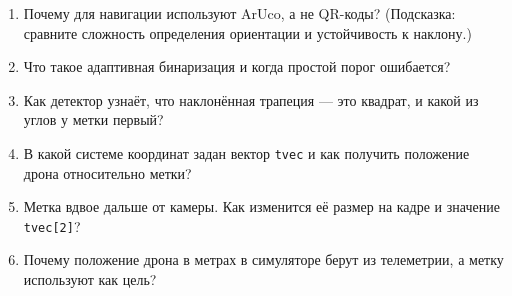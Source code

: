 \begin{questionbox}
\begin{enumerate}
    \item Почему для навигации используют ArUco, а не QR-коды? (Подсказка: сравните сложность определения ориентации и устойчивость к наклону.)
    \item Что такое адаптивная бинаризация и когда простой порог ошибается?
    \item Как детектор узнаёт, что наклонённая трапеция --- это квадрат, и какой из углов у метки первый?
    \item В какой системе координат задан вектор \texttt{tvec} и как получить положение дрона относительно метки?
    \item Метка вдвое дальше от камеры. Как изменится её размер на кадре и значение \texttt{tvec[2]}?
    \item Почему положение дрона в метрах в симуляторе берут из телеметрии, а метку используют как цель?
\end{enumerate}
\end{questionbox}

